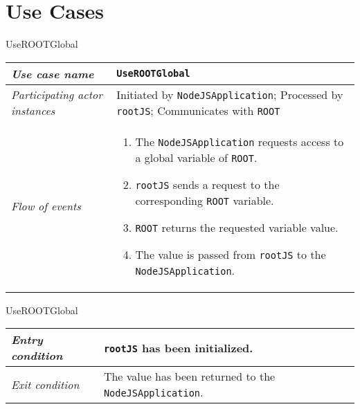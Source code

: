 \section{Use Cases}

\begin{frame}{UseROOTGlobal}
        \begin{longtable}{p{3cm} @{\hskip 1cm} p{7cm}}
                \hline

                \textit{Use case name} & \texttt{UseROOTGlobal}\\
                \hline

                \textit{Participating actor instances} & Initiated by \texttt{NodeJSApplication}; Processed by \texttt{rootJS}; Communicates with \texttt{ROOT}\\
                \hline

                \textit{Flow of events} &
                        \begin{enumerate}
                                \item The \texttt{NodeJSApplication} requests access to a global variable of \texttt{ROOT}.
                                \item \texttt{rootJS} sends a request to the corresponding \texttt{ROOT} variable.
                                \item \texttt{ROOT} returns the requested variable value.
                                \item The value is passed from \texttt{rootJS} to the \texttt{NodeJSApplication}.
                        \end{enumerate}
                        \\
        \end{longtable}
\end{frame}
\begin{frame}[t]{UseROOTGlobal}
        \begin{longtable}{p{3cm} @{\hskip 1cm} p{7cm}}
                \hline

                \textit{Entry condition} & \texttt{rootJS} has been initialized.\\
                \hline

                \textit{Exit condition} & The value has been returned to the \texttt{NodeJSApplication}.\\
                \hline
        \end{longtable}
\end{frame}

